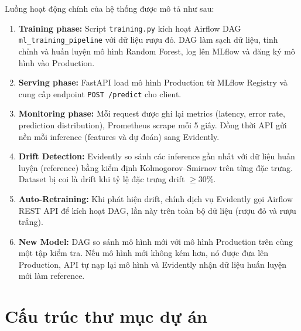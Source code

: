\documentclass[12pt,a4paper]{report}
\begin{document}
Luồng hoạt động chính của hệ thống được mô tả như sau:

\begin{enumerate}
  \item \textbf{Training phase:} Script \texttt{training.py} kích hoạt Airflow DAG \texttt{ml\_training\_pipeline} với dữ liệu rượu đỏ. DAG làm sạch dữ liệu, tinh chỉnh và huấn luyện mô hình Random Forest, log lên MLflow và đăng ký mô hình vào Production.
  \item \textbf{Serving phase:} FastAPI load mô hình Production từ MLflow Registry và cung cấp endpoint \texttt{POST /predict} cho client.
  \item \textbf{Monitoring phase:} Mỗi request được ghi lại metrics (latency, error rate, prediction distribution), Prometheus scrape mỗi 5 giây. Đồng thời API gửi nền mỗi inference (features và dự đoán) sang Evidently.
  \item \textbf{Drift Detection:} Evidently so sánh các inference gần nhất với dữ liệu huấn luyện (reference) bằng kiểm định Kolmogorov--Smirnov trên từng đặc trưng. Dataset bị coi là drift khi tỷ lệ đặc trưng drift $\geq 30\%$.
  \item \textbf{Auto-Retraining:} Khi phát hiện drift, chính dịch vụ Evidently gọi Airflow REST API để kích hoạt DAG, lần này trên toàn bộ dữ liệu (rượu đỏ và rượu trắng).
  \item \textbf{New Model:} DAG so sánh mô hình mới với mô hình Production trên cùng một tập kiểm tra. Nếu mô hình mới không kém hơn, nó được đưa lên Production, API tự nạp lại mô hình và Evidently nhận dữ liệu huấn luyện mới làm reference.
\end{enumerate}

\section{Cấu trúc thư mục dự án}
\end{document}
